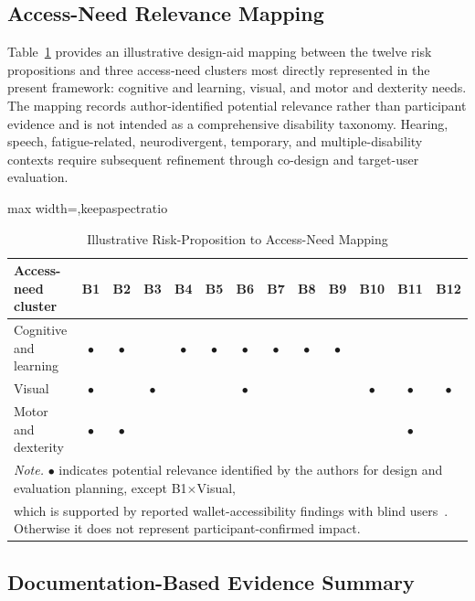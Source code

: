 \documentclass[journal]{IEEEtran}
\begin{document}
\subsection{Access-Need Relevance Mapping}

Table~\ref{tab:barrier-disability} provides an illustrative design-aid mapping between the twelve risk propositions and three access-need clusters most directly represented in the present framework: cognitive and learning, visual, and motor and dexterity needs. The mapping records author-identified potential relevance rather than participant evidence and is not intended as a comprehensive disability taxonomy. Hearing, speech, fatigue-related, neurodivergent, temporary, and multiple-disability contexts require subsequent refinement through co-design and target-user evaluation.

\begin{table}[!t]
\centering
\small
\caption{Illustrative Risk-Proposition to Access-Need Mapping}
\label{tab:barrier-disability}
\begin{adjustbox}{max width=\textwidth,keepaspectratio}
\begin{tabular}{|p{2.8cm}|*{12}{c|}}
\hline
\textbf{Access-need cluster} & \textbf{B1} & \textbf{B2} & \textbf{B3} & \textbf{B4} & \textbf{B5} & \textbf{B6} & \textbf{B7} & \textbf{B8} & \textbf{B9} & \textbf{B10} & \textbf{B11} & \textbf{B12} \\
\hline
Cognitive and learning & $\bullet$ & $\bullet$ &  & $\bullet$ & $\bullet$ & $\bullet$ & $\bullet$ & $\bullet$ & $\bullet$ &  &  &  \\
\hline
Visual & $\bullet$ &  & $\bullet$ &  &  & $\bullet$ &  &  &  & $\bullet$ & $\bullet$ & $\bullet$ \\
\hline
Motor and dexterity & $\bullet$ & $\bullet$ &  &  &  &  &  &  &  &  & $\bullet$ &  \\
\hline
\multicolumn{13}{l}{\footnotesize\textit{Note.} $\bullet$ indicates potential relevance identified by the authors for design and evaluation planning, except B1$\times$Visual,}\\
\multicolumn{13}{l}{\footnotesize which is supported by reported wallet-accessibility findings with blind users~\cite{zhou2023accessible}. Otherwise it does not represent participant-confirmed impact.}\\
\end{tabular}
\end{adjustbox}
\end{table}

\subsection{Documentation-Based Evidence Summary}
\end{document}
